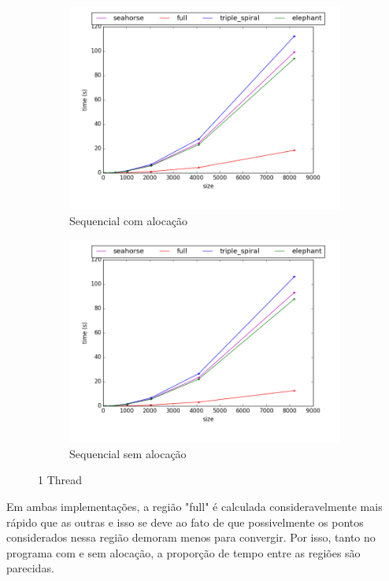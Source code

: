 \documentclass[final,12pt,a4paper]{elsarticle}
\begin{document}
\begin{figure}[htpb]
\centering
\begin{subfigure}{.55\textwidth}
  \centering
  \includegraphics[width=1\linewidth]{image1}
  \caption{Sequencial com alocação}
  \label{fig:image1}
\end{subfigure}%
\begin{subfigure}{.55\textwidth}
  \centering
  \includegraphics[width=1\linewidth]{image2}
  \caption{Sequencial sem alocação}
  \label{fig:image2}
\end{subfigure}
\caption{1 Thread}
\label{fig:sequencial}
\end{figure}

Em ambas implementações, a região "full" é calculada consideravelmente mais rápido que as outras e isso se deve ao fato de que possivelmente os pontos considerados nessa região demoram menos para convergir. Por isso, tanto no programa com e sem alocação, a proporção de tempo entre as regiões são parecidas.
\end{document}
